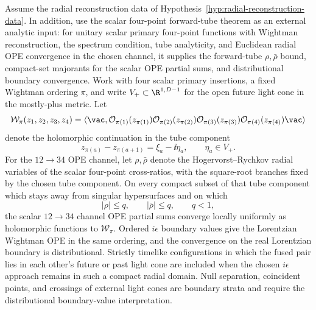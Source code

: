 \begin{proposition}
\label{prop:lorentzian-ope-continuation-domain}
Assume the radial reconstruction data of
Hypothesis~\ref{hyp:radial-reconstruction-data}.  In addition, use the scalar
four-point forward-tube theorem as an external analytic input: for unitary
scalar primary four-point functions with Wightman reconstruction, the spectrum
condition, tube analyticity, and Euclidean radial OPE convergence in the chosen
channel, it supplies the forward-tube \(\rho,\bar\rho\) bound, compact-set
majorants for the scalar OPE partial sums, and distributional boundary
convergence.  Work with four scalar primary insertions, a fixed Wightman
ordering \(\pi\), and write
\(V_+\subset\R^{1,D-1}\) for the open future light cone in the mostly-plus
metric.  Let
\[
  \mathcal W_\pi(z_1,z_2,z_3,z_4)
  =
  \langle\vac,
    \mathcal O_{\pi(1)}(z_{\pi(1)})
    \mathcal O_{\pi(2)}(z_{\pi(2)})
    \mathcal O_{\pi(3)}(z_{\pi(3)})
    \mathcal O_{\pi(4)}(z_{\pi(4)})\vac\rangle
\]
denote the holomorphic continuation in the tube component
\[
  z_{\pi(a)}-z_{\pi(a+1)}
  =
  \xi_a-\ii\eta_a,
  \qquad
  \eta_a\in V_+ .
\]
For the \(12\to34\) OPE channel, let \(\rho,\bar\rho\) denote the
Hogervorst--Rychkov radial variables of the scalar four-point cross-ratios,
with the square-root branches fixed by the chosen tube component.  On every
compact subset of that tube component which stays away from singular
hypersurfaces and on which
\begin{equation}
  |\rho|\le q,\qquad |\bar\rho|\le q,\qquad q<1,
  \label{eq:lorentzian-rho-compact-domain}
\end{equation}
the scalar \(12\to34\) channel OPE partial sums converge locally uniformly as
holomorphic functions to \(\mathcal W_\pi\).  Ordered \(i\epsilon\) boundary
values give the Lorentzian Wightman OPE in the same ordering, and the
convergence on the real Lorentzian boundary is distributional.  Strictly
timelike configurations in which the fused pair lies in each other's future or
past light cone are included when the chosen \(i\epsilon\) approach remains in
such a compact radial domain.  Null separation, coincident points, and crossings
of external light cones are boundary strata and require the distributional
boundary-value interpretation.
\end{proposition}

